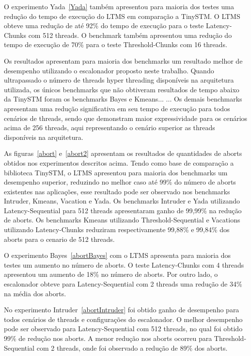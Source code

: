 \documentclass[diss,capa]{texufpel}
\begin{document}
O experimento Yada~\ref{Yada} também apresentou para maioria dos testes uma redução do tempo de execução do LTMS em comparação a TinySTM. O LTMS obteve uma redução de até 92\% do tempo de execução para o teste Latency-Chunks com 512 threads. O benchmark também apresentou uma redução do tempo de execução de 70\% para o teste Threshold-Chunks com 16 threads.

Os resultados apresentam para maioria dos benchmarks um resultado melhor de desempenho utilizando o escalonador proposto neste trabalho. Quando ultrapassado o número de threads hyper threading disponíveis na arquitetura utilizada, os únicos benchmarks que não obtiveram resultados de tempo abaixo da TinySTM foram os benchmarks Bayes e Kmeans...  ... Os demais benchmarks apresentam uma redução significativa em seu tempo de execução para todos cenários de threads, sendo que demonstram maior expressividade para os cenários acima de 256 threads, aqui representando o cenário superior as threads disponíveis na arquitetura.



As figuras~\ref{abort} e~\ref{abort2} apresentam os resultados de quantidades de aborts obtidos nos experimentos descritos acima. Tendo como base de comparação a biblioteca TinySTM, o LTMS apresentou para maioria dos benchmarks um desempenho superior, reduzindo no melhor caso até 99\% do número de aborts existentes nas aplicações, esse resultado pode ser observado nos benchmarks Intruder, Kmeans, Vacation e Yada. Os benchmarks Intruder e Yada utilizando Latency-Sequential para 512 threads apresentaram ganho de 99,99\% na redução de aborts. Os benchmarks Kmeans utilizando Threshold-Sequential e Vacations utilizando Latency-Chunks reduziram respectivamente 99,88\% e 99,84\% dos aborts para o cenario de 512 threads.

O experimento Bayes~\ref{abortBayes} com o LTMS apresenta para maioria dos testes um aumento no número de aborts. O teste Latency-Chunks com 4 threads apresentou um aumento de 18\% no número de aborts. Por outro lado, o escalonador obteve para Latency-Sequential com 2 threads uma redução de 34\% na média dos aborts.

No experimento Intruder~\ref{abortIntruder} foi obtido ganho de desempenho para todos cenários de threads e configurações do escalonador. O melhor desempenho pode ser observado para Latency-Sequential com 512 threads, no qual foi obtido 99\% de redução nos aborts. A menor redução nos aborts ocorreu para Threshold-Sequential com 2 threads, onde foi observado a redução de 89\% dos aborts.
\end{document}

